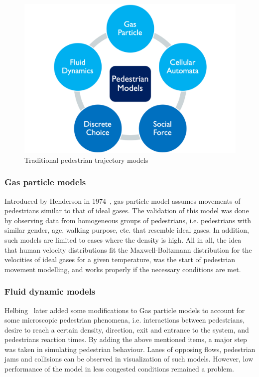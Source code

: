 \begin{figure}
    \centering
    \includegraphics[scale=0.5]{chapter_1b/figures/models.png}
    \caption{Traditional pedestrian trajectory models}
    \label{fig:tradtypes}
\end{figure}
\subsubsection{Gas particle models}
Introduced by Henderson in 1974~\cite{henderson1974fluid}, gas particle model assumes movements of pedestrians similar to that of ideal gases. The validation of this model was done by observing data from homogeneous groups of pedestrians, i.e. pedestrians with similar gender, age, walking purpose, etc. that resemble ideal gases. In addition, such models are limited to cases where the density is high. All in all, the idea that human velocity distributions fit the Maxwell-Boltzmann distribution for the velocities of ideal gases for a given temperature, was the start of pedestrian movement modelling, and works properly if the necessary conditions are met.

\subsubsection{Fluid dynamic models}
Helbing~\cite{helbing1998fluid} later added some modifications to Gas particle models to account for some microscopic pedestrian phenomena, i.e. interactions between pedestrians, desire to reach a certain density, direction, exit and entrance to the system, and pedestrians reaction times. By adding the above mentioned items, a major step was taken in simulating pedestrian behaviour. Lanes of opposing flows, pedestrian jams and collisions can be observed in visualization of such models. However, low performance of the model in less congested conditions remained a problem.

